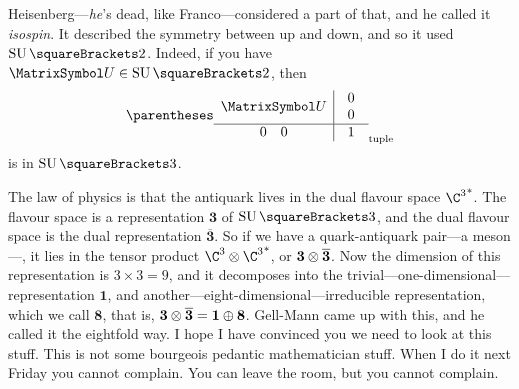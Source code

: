 \documentclass[10pt, a4paper, twoside]{lecturenotes}
\begin{document}
Heisenberg---\emph{he}'s dead, like Franco---considered a part of that, and he called it \emph{isospin}. It described the symmetry between up and down, and so it used $\SpecialUnitaryGroup\of 2$. Indeed, if you have $\matU\in\SpecialUnitaryGroup\of 2$, then\[
\tuple{\begin{array}{c|c}
\matU & \begin{array}{c}
0\\0
\end{array} \\
\hline
 \begin{array}{cc}0&0\end{array} & 1
\end{array}}
\] is in $\SpecialUnitaryGroup\of 3$.

\newcommand{\three}{\mathbf 3}
\newcommand{\threebar}{\overline{\mathbf 3}}
\newcommand{\eight}{\mathbf 8}
\newcommand{\one}{\mathbf 1}

The law of physics is that the antiquark lives in the dual flavour space $\Dual{{\C^3}}$. The flavour space is a representation $\three$ of $\SpecialUnitaryGroup\of 3$, and the dual flavour space is the dual representation $\threebar$. So if we have a quark-antiquark pair---a meson---, it lies in the tensor product $\C^3\Tensor\Dual{{\C^3}}$, or $\three\Tensor\threebar$. Now the dimension of this representation is $3\times3=9$, and it decomposes into the trivial---one-dimensional---representation $\one$, and another---eight-dimensional---irreducible representation, which we call $\eight$, that is, $\three\Tensor\threebar=\one\DirectSum\eight$. Gell-Mann came up with this, and he called it the eightfold way. I hope I have convinced you we need to look at this stuff. This is not some bourgeois pedantic mathematician stuff. When I do it next Friday you cannot complain. You can leave the room, but you cannot complain.
\end{document}
